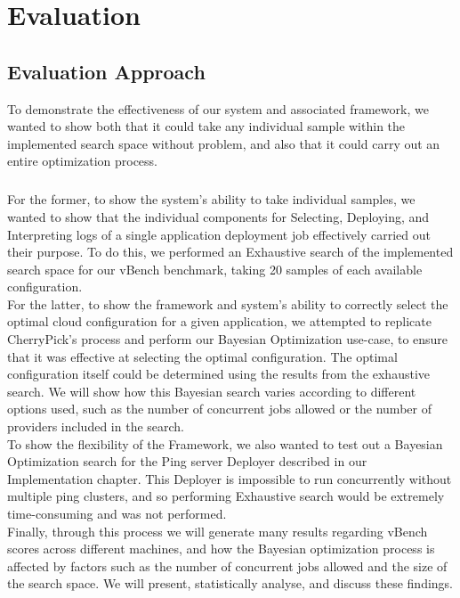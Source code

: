 \documentclass{report}
\begin{document}
\chapter{Evaluation}
\section{Evaluation Approach}
To demonstrate the effectiveness of our system and associated framework, we wanted to show both that it could take any individual sample within the implemented search space without problem, and also that it could carry out an entire optimization process. 
\paragraph{}
For the former, to show the system's ability to take individual samples, we wanted to show that the individual components for Selecting, Deploying, and Interpreting logs of a single application deployment job effectively carried out their purpose. To do this, we performed an Exhaustive search of the implemented search space for our vBench benchmark, taking 20 samples of each available configuration.\\
For the latter, to show the framework and system's ability to correctly select the optimal cloud configuration for a given application, we attempted to replicate CherryPick's\cite{Alipourfard2017} process and perform our Bayesian Optimization use-case, to ensure that it was effective at selecting the optimal configuration. The optimal configuration itself could be determined using the results from the exhaustive search. We will show how this Bayesian search varies according to different options used, such as the number of concurrent jobs allowed or the number of providers included in the search.\\
To show the flexibility of the Framework, we also wanted to test out a Bayesian Optimization search for the Ping server Deployer described in our Implementation chapter. This Deployer is impossible to run concurrently without multiple ping clusters, and so performing Exhaustive search would be extremely time-consuming and was not performed. \\
Finally, through this process we will generate many results regarding vBench scores across different machines, and how the Bayesian optimization process is affected by factors such as the number of concurrent jobs allowed and the size of the search space. We will present, statistically analyse, and discuss these findings.
\end{document}
